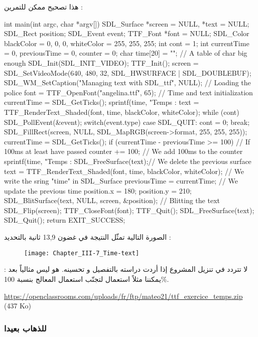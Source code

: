 هذا تصحيح ممكن للتمرين :

\begin{Csource}
int main(int argc, char *argv[])
{
	SDL_Surface *screen = NULL, *text = NULL;
	SDL_Rect position;
	SDL_Event event;
	TTF_Font *font = NULL;
	SDL_Color blackColor = {0, 0, 0}, whiteColor = {255, 255, 255};
	int cont = 1;
	int currentTime = 0, previousTime = 0, counter = 0;
	char time[20] = ""; // A table of char big enough
	SDL_Init(SDL_INIT_VIDEO);
	TTF_Init();
	screen = SDL_SetVideoMode(640, 480, 32, SDL_HWSURFACE | SDL_DOUBLEBUF);
	SDL_WM_SetCaption("Managing text with SDL_ttf", NULL);
	// Loading the police
	font = TTF_OpenFont("angelina.ttf", 65);
	// Time and text initialization
	currentTime = SDL_GetTicks();
	sprintf(time, "Temps : %
	text = TTF_RenderText_Shaded(font, time, blackColor, whiteColor);
	while (cont)
	{
		SDL_PollEvent(&event);
		switch(event.type)
		{
			case SDL_QUIT:
			cont = 0;
			break;
		}
		SDL_FillRect(screen, NULL, SDL_MapRGB(screen->format, 255, 255, 255));
		currentTime = SDL_GetTicks();
		if (currentTime - previousTime >= 100) // If 100ms at least have passed
		{
			counter += 100; // We add 100ms to the counter
			sprintf(time, "Temps : %
			SDL_FreeSurface(text);// We delete the previous surface
			text = TTF_RenderText_Shaded(font, time, blackColor, whiteColor); // We write the sring "time" in SDL_Surface
			previousTime = currentTime; // We update the previous time
		}
		position.x = 180;
		position.y = 210;
		SDL_BlitSurface(text, NULL, screen, &position); // Blitting the text
		SDL_Flip(screen);
	}
	TTF_CloseFont(font);
	TTF_Quit();
	SDL_FreeSurface(text);
	SDL_Quit();
	return EXIT_SUCCESS;
}
\end{Csource}
 
الصورة التالية تمثّل النتيجة في غضون 13,9 ثانية بالتحديد :

\begin{figure}[H]
	\centering
	\texttt{[image: Chapter\_III-7\_Time-text]}
\end{figure}

لا تتردد في تنزيل المشروع إذا أردت دراسته بالتفصيل و تحسينه. هو ليس مثالياً بعد : يمكننا مثلاً استعمال
لتجنّب استعمال المعالج بنسبة 100\%.

\textenglish{\url{https://openclassrooms.com/uploads/fr/ftp/mateo21/ttf_exercice_temps.zip} (437 Ko)}

\subsubsection{للذهاب بعيدا}

